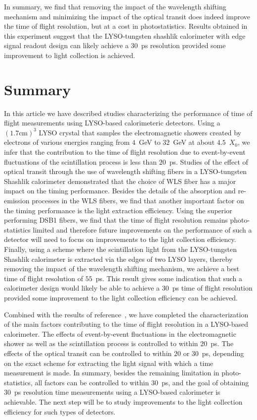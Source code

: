 \documentclass[12pt]{article}
\begin{document}
In summary, we find that removing the impact of the wavelength shifting mechanism
and minimizing the impact of the optical transit does indeed improve the time
of flight resolution, but at a cost in photostatistics. Results obtained in this
experiment suggest that the LYSO-tungsten shashlik calorimeter with edge
signal readout design can likely achieve a $30$~ps resolution provided 
some improvement to light collection is achieved.

\section{Summary}

In this article we have described studies characterizing the 
performance of time of flight measurements using
LYSO-based calorimeteric detectors. Using a $(1.7\mathrm{ cm})^{3}$
LYSO crystal that samples the electromagnetic showers created
by electrons of various energies ranging from $4$~GeV to $32$~GeV
at about $4.5$~$X_{0}$, we infer that the contribution to the 
time of flight resolution due to event-by-event fluctuations 
of the scintillation process is less than $20$~ps. Studies of the
effect of optical transit through the use of wavelength shifting
fibers in a LYSO-tungsten Shashlik calorimeter demonstrated that
the choice of WLS fiber has a major impact on the timing performance.
Besides the details of the absorption and re-emission processes in
the WLS fibers, we find that another important factor on
the timing performance is the light extraction efficiency. Using
the superior performing DSB1 fibers, we find that the time
of flight resolution remains photo-statistics limited
and therefore future improvements on the performance of such a 
detector will need to focus on improvements to the light collection
efficiency. Finally, using a scheme where the scintillation
light from the LYSO-tungsten Shashlik calorimeter is extracted
via the edges of two LYSO layers, thereby removing the impact
of the wavelength shifting mechanism, we achieve a best time of 
flight resolution of $55$~ps. This result gives some indication that such a
calorimeter design would likely be able to achieve a $30$~ps 
time of flight resolution provided some improvement to the 
light collection efficiency can be achieved.

Combined with the results of reference~\cite{MCPFastCaloNIMA}, we 
have completed the characterization of the main factors
contributing to the time of flight resolution in a LYSO-based
calorimeter. The effects of event-by-event fluctuations in
the electromagnetic shower as well as the scintillation process 
is controlled to within $20$~ps. The effects of the optical transit
can be controlled to within $20$ or $30$~ps, depending on the
exact scheme for extracting the light signal with which a
time measurement is made. In summary, besides the remaining
limitation in photo-statistics, all factors can be controlled
to within $30$~ps, and the goal of obtaining $30$~ps
resolution time measurements using a LYSO-based calorimeter
is achievable. The next step will be to study improvements
to the light collection efficiency for such types of detectors.

{}

\end{document}
